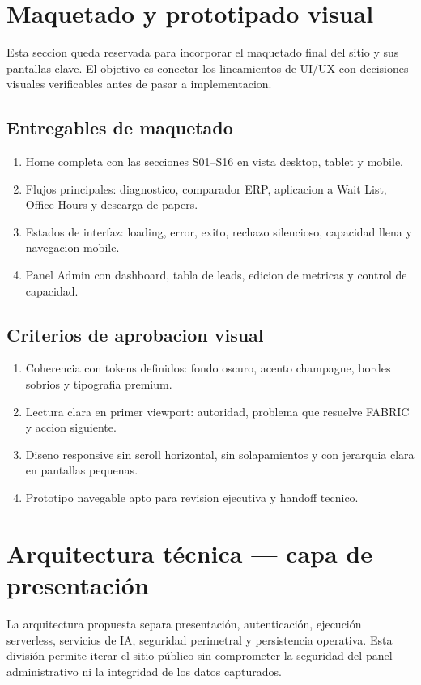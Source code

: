 \documentclass[11pt,letterpaper]{article}
\begin{document}
\section{Maquetado y prototipado visual}
Esta seccion queda reservada para incorporar el maquetado final del sitio y sus pantallas clave. El objetivo es conectar los lineamientos de UI/UX con decisiones visuales verificables antes de pasar a implementacion.

\subsection{Entregables de maquetado}
\begin{enumerate}
\item Home completa con las secciones S01--S16 en vista desktop, tablet y mobile.
\item Flujos principales: diagnostico, comparador ERP, aplicacion a Wait List, Office Hours y descarga de papers.
\item Estados de interfaz: loading, error, exito, rechazo silencioso, capacidad llena y navegacion mobile.
\item Panel Admin con dashboard, tabla de leads, edicion de metricas y control de capacidad.
\end{enumerate}

\subsection{Criterios de aprobacion visual}
\begin{enumerate}
\item Coherencia con tokens definidos: fondo oscuro, acento champagne, bordes sobrios y tipografia premium.
\item Lectura clara en primer viewport: autoridad, problema que resuelve FABRIC y accion siguiente.
\item Diseno responsive sin scroll horizontal, sin solapamientos y con jerarquia clara en pantallas pequenas.
\item Prototipo navegable apto para revision ejecutiva y handoff tecnico.
\end{enumerate}

\section{Arquitectura técnica — capa de presentación}

La arquitectura propuesta separa presentación, autenticación, ejecución serverless, servicios de IA, seguridad perimetral y persistencia operativa. Esta división permite iterar el sitio público sin comprometer la seguridad del panel administrativo ni la integridad de los datos capturados.
\end{document}
